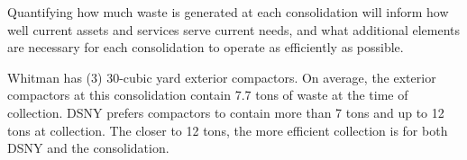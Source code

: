 
    Quantifying how much waste is generated at each consolidation will inform how well current assets and services serve current needs, and what additional elements are necessary for each consolidation to operate as efficiently as possible.
    
    Whitman has (3) 30-cubic yard exterior compactors. On average, the exterior compactors at this consolidation contain 7.7 tons of waste at the time of collection. DSNY prefers compactors to contain more than 7 tons and up to 12 tons at collection. The closer to 12 tons, the more efficient collection is for both DSNY and the consolidation.